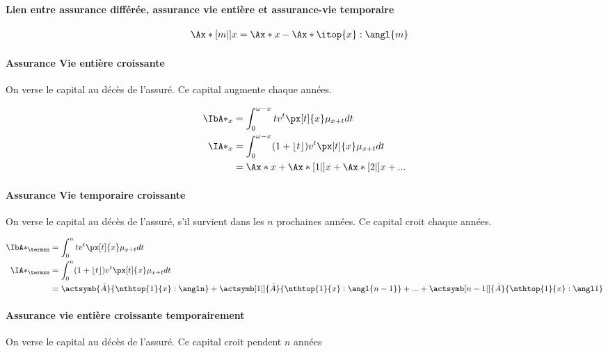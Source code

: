 \documentclass[10pt, french]{article}
\begin{document}
\begin{multicols*}{3}
\paragraph{Lien entre assurance différée, assurance vie entière et assurance-vie temporaire}

\begin{align*}
\Ax*[m|]{x}	& = \Ax*{x} - \Ax*{\itop{x}:\angl{m}}
\end{align*}

\paragraph{Assurance Vie entière croissante} On verse le capital au décès de l'assuré. Ce capital augmente chaque années.

\begin{align*}
	\IbA*_x &= \int_0^{\omega - x} t v^t \px[t]{x} \mu_{x+t} dt \\
	\IA*_{x} &= \int_0^{\omega - x} (1 + \lfloor t \rfloor) v^t \px[t]{x} \mu_{x+t} dt \\
		&= \Ax*{x} + \Ax*[1|]{x} + \Ax*[2|]{x} + ...
\end{align*}

\paragraph{Assurance Vie temporaire croissante} On verse le capital au décès de l'assuré, s'il survient dans les $n$ prochaines années. Ce capital croit chaque années.

\begin{align*}
	\IbA*_{\termxn} &= \int_0^n t v^t \px[t]{x} \mu_{x+t} dt \\
	\IA*_{\termxn}  &= \int_0^n (1 + \lfloor t \rfloor) v^t \px[t]{x} \mu_{x+t} dt \\
		&= \actsymb{\bar{A}}{\nthtop{1}{x}:\angln} + \actsymb[1|]{\bar{A}}{\nthtop{1}{x}:\angl{n-1}} + ... + \actsymb[n-1|]{\bar{A}}{\nthtop{1}{x}:\angl1}
\end{align*}

\paragraph{Assurance vie entière croissante temporairement} On verse le capital au décès de l'assuré. Ce capital croit pendent $n$ années


\end{multicols*}
\end{document}
